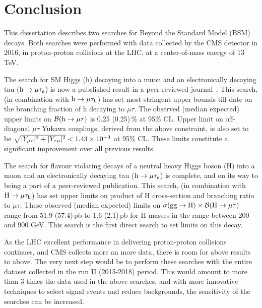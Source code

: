 %
%

\chapter{Conclusion}
\label{conclusion}

This dissertation describes two searches for Beyond the Standard Model (BSM) decays. Both searches were performed with data collected by the CMS detector in 2016, in proton-proton collisions at the LHC, at a center-of-mass energy of 13\,TeV.

The search for SM Higgs (h) decaying into a muon and an electronically decaying tau ($\text{h} \to \mu \tau_{e}$) is now a pubslished result in a peer-reviewed journal~\cite{HIG-17-001}. This search, (in combination with $\text{h} \to \mu \tau_{\text{h}}$) has set most stringent upper bounds till date on the branching fraction of h decaying to $\mu\tau$. The observed (median expected) upper limits on $\mathcal{B}(\text{h} \to \mu \tau)$ is 0.25 (0.25)\,\% at 95\% CL. Upper limit on off-diagonal $\mu\tau$ Yukawa couplings, derived from the above constraint, is also set to be $\sqrt{|Y_{\mu\tau}|^{2}+|Y_{\tau\mu}|^{2}}<1.43\times 10^{-3}$ at 95\% CL. These limits constitute a significant improvement over all previous results.

The search for flavour violating decays of a neutral heavy Higgs boson (H) into a muon and an electronically decaying tau ($\text{h} \to \mu \tau_{e}$) is complete, and on its way to being a part of a peer-reviewed publication. This search, (in combination with $\text{H} \to \mu \tau_{\text{h}}$) has set upper limits on product of H cross-section and branching ratio to $\mu\tau$. These observed (median expected) limits on $\sigma(\textrm{gg}\rightarrow \text{H})\times\mathcal{B}(\text{H} \to \mu \tau)$ range from 51.9 (57.4)\,pb to 1.6 (2.1)\,pb for H masses in the range between 200 and 900 GeV. This search is the first direct search to set limits on this decay.

As the LHC excellent performance in delivering proton-proton collisions continues, and CMS collects more an more  data, there is room for above results to above. The very next step would be to perform these searches with the entire dataset collected in the run II (2015-2018) period. This would amount to more than 3 times the data used in the above searches, and with more innovative techniques to select signal events and reduce backgrounds, the sensitivity of the searches can be increased. 







